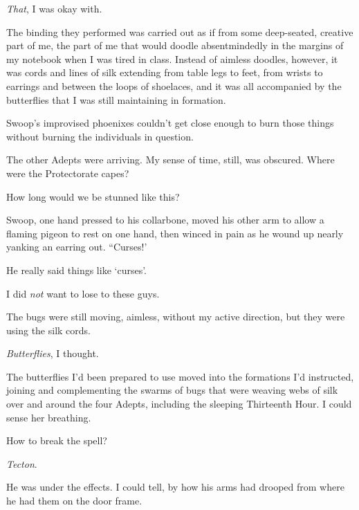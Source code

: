 \emph{That}, I was okay with.



The binding they performed was carried out as if from some deep-seated, creative part of me, the part of me that would doodle absentmindedly in the margins of my notebook when I was tired in class.  Instead of aimless doodles, however, it was cords and lines of silk extending from table legs to feet, from wrists to earrings and between the loops of shoelaces, and it was all accompanied by the butterflies that I was still maintaining in formation.



Swoop's improvised phoenixes couldn't get close enough to burn those things without burning the individuals in question.



The other Adepts were arriving.  My sense of time, still, was obscured.  Where were the Protectorate capes?



How long would we be stunned like this?



Swoop, one hand pressed to his collarbone, moved his other arm to allow a flaming pigeon to rest on one hand, then winced in pain as he wound up nearly yanking an earring out.  ``Curses!'



He really said things like `curses'.



I did \emph{not} want to lose to these guys.



The bugs were still moving, aimless, without my active direction, but they were using the silk cords.



\emph{Butterflies}, I thought.



The butterflies I'd been prepared to use moved into the formations I'd instructed, joining and complementing the swarms of bugs that were weaving webs of silk over and around the four Adepts, including the sleeping Thirteenth Hour.  I could sense her breathing.



How to break the spell?



\emph{Tecton}.



He was under the effects.  I could tell, by how his arms had drooped from where he had them on the door frame.



